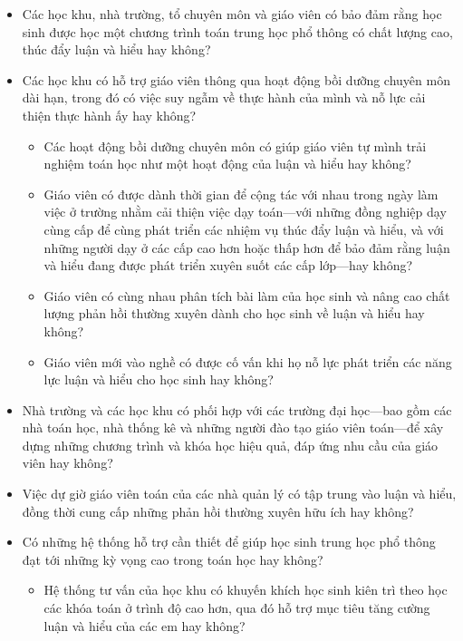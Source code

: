 \documentclass[
  10pt,
  a4paper,
  landscape,
  twoside,
  openany
]{scrbook}
\newcommand{\VI}[1]{#1}
\begin{document}
{
\VI{
  \begin{itemize}
    \item Các học khu, nhà trường, tổ chuyên môn và giáo viên có bảo đảm rằng học sinh được học một chương trình toán trung học phổ thông có chất lượng cao, thúc đẩy luận và hiểu hay không?
    \item Các học khu có hỗ trợ giáo viên thông qua hoạt động bồi dưỡng chuyên môn dài hạn, trong đó có việc suy ngẫm về thực hành của mình và nỗ lực cải thiện thực hành ấy hay không?
      \begin{itemize}
        \item Các hoạt động bồi dưỡng chuyên môn có giúp giáo viên tự mình trải nghiệm toán học như một hoạt động của luận và hiểu hay không?
        \item Giáo viên có được dành thời gian để cộng tác với nhau trong ngày làm việc ở trường nhằm cải thiện việc dạy toán---với những đồng nghiệp dạy cùng cấp để cùng phát triển các nhiệm vụ thúc đẩy luận và hiểu, và với những người dạy ở các cấp cao hơn hoặc thấp hơn để bảo đảm rằng luận và hiểu đang được phát triển xuyên suốt các cấp lớp---hay không?
        \item Giáo viên có cùng nhau phân tích bài làm của học sinh và nâng cao chất lượng phản hồi thường xuyên dành cho học sinh về luận và hiểu hay không?
        \item Giáo viên mới vào nghề có được cố vấn khi họ nỗ lực phát triển các năng lực luận và hiểu cho học sinh hay không?
      \end{itemize}
    \item Nhà trường và các học khu có phối hợp với các trường đại học---bao gồm các nhà toán học, nhà thống kê và những người đào tạo giáo viên toán---để xây dựng những chương trình và khóa học hiệu quả, đáp ứng nhu cầu của giáo viên hay không?
    \item Việc dự giờ giáo viên toán của các nhà quản lý có tập trung vào luận và hiểu, đồng thời cung cấp những phản hồi thường xuyên hữu ích hay không?
    \item Có những hệ thống hỗ trợ cần thiết để giúp học sinh trung học phổ thông đạt tới những kỳ vọng cao trong toán học hay không?
      \begin{itemize}
        \item Hệ thống tư vấn của học khu có khuyến khích học sinh kiên trì theo học các khóa toán ở trình độ cao hơn, qua đó hỗ trợ mục tiêu tăng cường luận và hiểu của các em hay không?
      \end{itemize}
  \end{itemize}}
}
\end{document}
